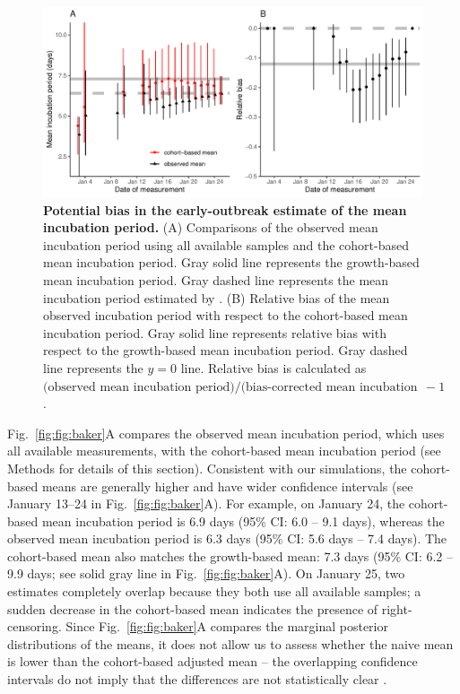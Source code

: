 \documentclass[12pt]{article}
\newcommand{\fref}[1]{Fig.~\ref{fig:#1}}
\begin{document}
\begin{figure}[!th]
\includegraphics[width=\textwidth]{figure_baker.pdf}
\caption{
\textbf{Potential bias in the early-outbreak estimate of the mean incubation period.}
(A) Comparisons of the observed mean incubation period using all available samples and the cohort-based mean incubation period.
Gray solid line represents the growth-based mean incubation period.
Gray dashed line represents the mean incubation period estimated by \cite{backer2020incubation}.
(B) Relative bias of the mean observed incubation period with respect to the cohort-based mean incubation period.
Gray solid line represents relative bias with respect to the growth-based mean incubation period.
Gray dashed line represents the $y=0$ line.
Relative bias is calculated as $\textrm{(observed mean incubation period)/(bias-corrected mean incubation period)} - 1$.
}
\label{fig:baker}
\end{figure}

\fref{fig:baker}A compares the observed mean incubation period, which uses all available measurements, with the cohort-based mean incubation period (see Methods for details of this section).
Consistent with our simulations, the cohort-based means are generally higher and have wider confidence intervals (see January 13--24 in \fref{fig:baker}A).
For example, on January 24, the cohort-based mean incubation period is 6.9 days (95\% CI: 6.0 -- 9.1 days), whereas the observed mean incubation period is 6.3 days (95\% CI: 5.6 days -- 7.4 days).
The cohort-based mean also matches the growth-based mean: 7.3 days (95\% CI: 6.2 -- 9.9 days; see solid gray line in \fref{fig:baker}A).
On January 25, two estimates completely overlap because they both use all available samples; a sudden decrease in the cohort-based mean indicates the presence of right-censoring.
Since \fref{fig:baker}A compares the marginal posterior distributions of the means, it does not allow us to assess whether the naive mean is lower than the cohort-based adjusted mean -- the overlapping confidence intervals do not imply that the differences are not statistically clear \citep{dushoff2019can}.
\end{document}
